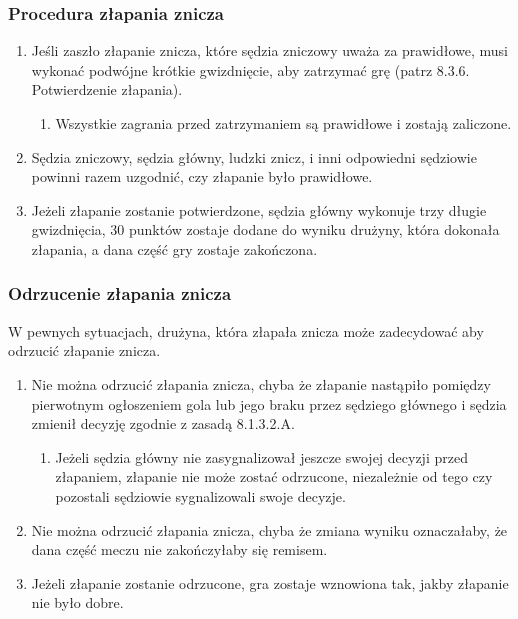 \documentclass[12pt]{article}
\begin{document}
\subsubsection{Procedura złapania znicza}

\begin{enumerate}
	\item
	      Jeśli zaszło złapanie znicza, które sędzia zniczowy uważa za
	      prawidłowe, musi wykonać podwójne krótkie gwizdnięcie, aby zatrzymać
	      grę (patrz 8.3.6. Potwierdzenie złapania).

	      \begin{enumerate}
		      \item
		            Wszystkie zagrania przed zatrzymaniem są prawidłowe i zostają
		            zaliczone.
	      \end{enumerate}
	\item
	      Sędzia zniczowy, sędzia główny, ludzki znicz, i inni odpowiedni
	      sędziowie powinni razem uzgodnić, czy złapanie było prawidłowe.
	\item
	      Jeżeli złapanie zostanie potwierdzone, sędzia główny wykonuje trzy
	      długie gwizdnięcia, 30 punktów zostaje dodane do wyniku drużyny, która
	      dokonała złapania, a dana część gry zostaje zakończona.
\end{enumerate}

\subsubsection{Odrzucenie złapania znicza}

W pewnych sytuacjach, drużyna, która złapała znicza może zadecydować aby
odrzucić złapanie znicza.

\begin{enumerate}
	\item
	      Nie można odrzucić złapania znicza, chyba że złapanie nastąpiło
	      pomiędzy pierwotnym ogłoszeniem gola lub jego braku przez sędziego
	      głównego i sędzia zmienił decyzję zgodnie z zasadą 8.1.3.2.A.

	      \begin{enumerate}
		      \item
		            Jeżeli sędzia główny nie zasygnalizował jeszcze swojej decyzji przed
		            złapaniem, złapanie nie może zostać odrzucone, niezależnie od tego
		            czy pozostali sędziowie sygnalizowali swoje decyzje.
	      \end{enumerate}
	\item
	      Nie można odrzucić złapania znicza, chyba że zmiana wyniku
	      oznaczałaby, że dana część meczu nie zakończyłaby się remisem.
	\item
	      Jeżeli złapanie zostanie odrzucone, gra zostaje wznowiona tak, jakby
	      złapanie nie było dobre.
\end{enumerate}
\end{document}
